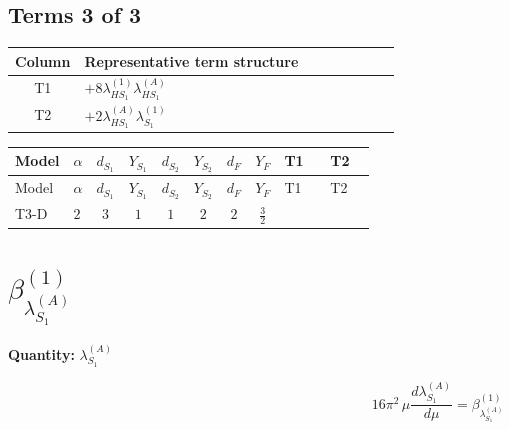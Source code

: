 \documentclass[8pt]{article}
\begin{document}
\begin{landscape}
\subsection*{Terms 3 of 3}
\begin{center}
\begin{tabular}{@{}c >{\raggedright\arraybackslash}p{0.82\linewidth}@{}}
\toprule
Column & Representative term structure \\
\midrule
T1 & \(\displaystyle +8 {\lambda_{HS_1}^{(1)}} {\lambda_{HS_1}^{(A)}}\) \\
\midrule
T2 & \(\displaystyle +2 {\lambda_{HS_1}^{(A)}} {\lambda_{S_1}^{(1)}}\) \\
\midrule
\bottomrule
\end{tabular}
\end{center}
\smallskip
\tiny
\begin{longtable}{@{}llcccccc >{\raggedright\arraybackslash}p{0.21\linewidth} >{\raggedright\arraybackslash}p{0.21\linewidth}@{}}
\toprule
Model & $\alpha$ & $d_{S_1}$ & $Y_{S_1}$ & $d_{S_2}$ & $Y_{S_2}$ & $d_F$ & $Y_F$ & T1 & T2 \\
\midrule
\endfirsthead
\toprule
Model & $\alpha$ & $d_{S_1}$ & $Y_{S_1}$ & $d_{S_2}$ & $Y_{S_2}$ & $d_F$ & $Y_F$ & T1 & T2 \\
\midrule
\endhead
T3-D & $2$ & $3$ & $1$ & $1$ & $2$ & $2$ & $\frac{3}{2}$ & \scriptsize\adjustbox{max width=\linewidth}{$\begin{gathered} +8 {\lambda_{HS_1}^{(1)}} {\lambda_{HS_1}^{(A)}}\end{gathered}$} & \scriptsize\adjustbox{max width=\linewidth}{$\begin{gathered} +2 {\lambda_{HS_1}^{(A)}} {\lambda_{S_1}^{(1)}}\end{gathered}$} \\
\midrule
\bottomrule
\end{longtable}
\clearpage
\section*{$\beta_{\lambda_{S_1}^{(A)}}^{(1)}$}
\noindent\textbf{Quantity: }$\lambda_{S_1}^{(A)}$\par\smallskip
\[16\pi^2\,\mu\frac{d \lambda_{S_1}^{(A)}}{d\mu}=\beta_{\lambda_{S_1}^{(A)}}^{(1)}\]

\end{landscape}
\end{document}
